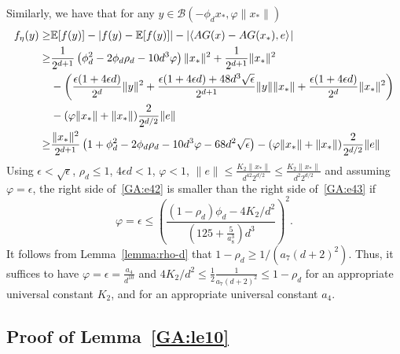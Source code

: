Similarly, we have that for any $y \in \mathcal{B}(- \phi_d x_*, \varphi  \|x_*\|)$
\begin{align}
f_\eta(y) \geq& \mathbb{E}[f(y)] - |f(y) - \mathbb{E}[f(y)]|
-
\left|\inner[]{A G(x) - A G(x_\ast)}{e}\right|
  \nonumber \\
\geq& \frac{1}{2^{d+1}} \left(\phi_d^2 - 2 \phi_d \rho_d - 10 d^3 \varphi \right) \|x_*\|^2 + \frac{1}{2^{d+1}} \|x_*\|^2 \nonumber \\
&- \left( \frac{\epsilon (1 + 4 \epsilon d)}{2^d} \|y\|^2 + \frac{\epsilon(1 + 4 \epsilon d) + 48 d^3 \sqrt{\epsilon}}{2^{d+1}} \|y\| \|x_*\| + \frac{\epsilon (1 + 4 \epsilon d)}{2^d} \|x_*\|^2 \right) \nonumber \\
&- (\varphi \|x_*\| + \|x_*\|) \frac{2}{2^{d/2}} \|e\| \nonumber \\
\geq&
\frac{\|x_*\|^2}{2^{d+1}} \left(1 + \phi_d^2 - 2 \phi_d \rho_d - 10 d^3 \varphi
- 68 d^2 \sqrt{\epsilon}
\right) -(\varphi \|x_*\| + \|x_*\|) \frac{2}{2^{d/2}} \|e\|
\label{GA:e43}
\end{align}
Using $\epsilon < \sqrt{\epsilon}$, $\rho_d \leq 1$, $4 \epsilon d < 1$, $\varphi < 1$, $\|e\| \leq \frac{K_2\|x_*\|}{d^{42} 2^{d/2}} \leq \frac{K_2\|x_*\|}{d^{2} 2^{d/2}}$ and assuming $\varphi = \epsilon$, the right side of~\eqref{GA:e42} is smaller than the right side of~\eqref{GA:e43} if
\begin{equation} \label{GA:e44}
\varphi = \epsilon \leq \left(\frac{(1  - \rho_d) \phi_d  - 4 K_2/d^2}{\left( 125 + \frac{5}{a_8^3} \right) d^3} \right)^2.
\end{equation}
It follows from Lemma~\ref{lemma:rho-d} that $1 - \rho_d \geq 1 / (a_7(d+2)^2)$.
Thus, it suffices to have $\varphi = \epsilon = \frac{a_4}{d^{10}}$ and $4 K_2 / d^2 \leq \frac{1}{2} \frac{1}{a_7 (d+2)^2} \leq 1 - \rho_d$ for an appropriate universal constant $K_2$, and for an appropriate universal constant $a_4$.  %


\subsection{Proof of Lemma~\ref{GA:le10}}


